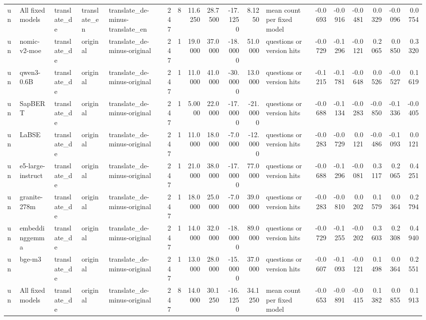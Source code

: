 \begin{tabular}{lllllrrrrrrlrrrrrr}
un & All fixed models & translate\_de & translate\_en & translate\_de-minus-translate\_en & 247 & 8 & 11.6250 & 28.7500 & -17.1250 & 8.1250 & mean count per fixed model & -0.0693 & -0.0916 & -0.0481 & 0.0329 & -0.0096 & 0.0754 \\
un & nomic-v2-moe & translate\_de & original & translate\_de-minus-original & 247 & 1 & 19.0000 & 37.0000 & -18.0000 & 51.0000 & questions or version hits & -0.0729 & -0.1296 & -0.0121 & 0.2065 & 0.0850 & 0.3320 \\
un & qwen3-0.6B & translate\_de & original & translate\_de-minus-original & 247 & 1 & 11.0000 & 41.0000 & -30.0000 & 13.0000 & questions or version hits & -0.1215 & -0.1781 & -0.0648 & 0.0526 & -0.0527 & 0.1619 \\
un & SapBERT & translate\_de & original & translate\_de-minus-original & 247 & 1 & 5.0000 & 22.0000 & -17.0000 & -21.0000 & questions or version hits & -0.0688 & -0.1134 & -0.0283 & -0.0850 & -0.1336 & -0.0405 \\
un & LaBSE & translate\_de & original & translate\_de-minus-original & 247 & 1 & 11.0000 & 18.0000 & -7.0000 & -12.0000 & questions or version hits & -0.0283 & -0.0729 & 0.0121 & -0.0486 & -0.1093 & 0.0121 \\
un & e5-large-instruct & translate\_de & original & translate\_de-minus-original & 247 & 1 & 21.0000 & 38.0000 & -17.0000 & 77.0000 & questions or version hits & -0.0688 & -0.1296 & -0.0081 & 0.3117 & 0.2065 & 0.4251 \\
un & granite-278m & translate\_de & original & translate\_de-minus-original & 247 & 1 & 18.0000 & 25.0000 & -7.0000 & 39.0000 & questions or version hits & -0.0283 & -0.0810 & 0.0202 & 0.1579 & 0.0364 & 0.2794 \\
un & embeddinggemma & translate\_de & original & translate\_de-minus-original & 247 & 1 & 14.0000 & 32.0000 & -18.0000 & 89.0000 & questions or version hits & -0.0729 & -0.1255 & -0.0202 & 0.3603 & 0.2308 & 0.4940 \\
un & bge-m3 & translate\_de & original & translate\_de-minus-original & 247 & 1 & 13.0000 & 28.0000 & -15.0000 & 37.0000 & questions or version hits & -0.0607 & -0.1093 & -0.0121 & 0.1498 & 0.0364 & 0.2551 \\
un & All fixed models & translate\_de & original & translate\_de-minus-original & 247 & 8 & 14.0000 & 30.1250 & -16.1250 & 34.1250 & mean count per fixed model & -0.0653 & -0.0891 & -0.0415 & 0.1382 & 0.0855 & 0.1913 \\
\bottomrule
\end{tabular}
